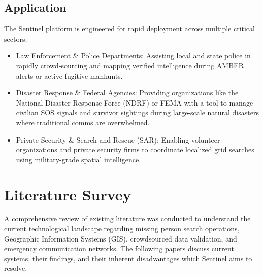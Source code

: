\documentclass[12pt,a4paper]{report}
\begin{document}
\section{Application}
The Sentinel platform is engineered for rapid deployment across multiple critical sectors:
\begin{itemize}
    \item Law Enforcement \& Police Departments: Assisting local and state police in rapidly crowd-sourcing and mapping verified intelligence during AMBER alerts or active fugitive manhunts.
    \item Disaster Response \& Federal Agencies: Providing organizations like the National Disaster Response Force (NDRF) or FEMA with a tool to manage civilian SOS signals and survivor sightings during large-scale natural disasters where traditional comms are overwhelmed.
    \item Private Security \& Search and Rescue (SAR): Enabling volunteer organizations and private security firms to coordinate localized grid searches using military-grade spatial intelligence.
\end{itemize}

\chapter{Literature Survey}
A comprehensive review of existing literature was conducted to understand the current technological landscape regarding missing person search operations, Geographic Information Systems (GIS), crowdsourced data validation, and emergency communication networks. The following papers discuss current systems, their findings, and their inherent disadvantages which Sentinel aims to resolve.
\end{document}
